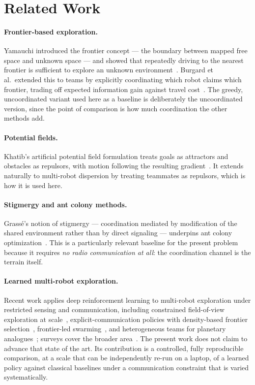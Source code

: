 \documentclass[11pt]{article}
\begin{document}
\section{Related Work}

\paragraph{Frontier-based exploration.}
Yamauchi introduced the frontier concept --- the boundary between mapped free
space and unknown space --- and showed that repeatedly driving to the nearest
frontier is sufficient to explore an unknown environment~\cite{yamauchi1997}.
Burgard et al.\ extended this to teams by explicitly coordinating which robot
claims which frontier, trading off expected information gain against travel
cost~\cite{burgard2005}. The greedy, uncoordinated variant used here as a
baseline is deliberately the uncoordinated version, since the point of
comparison is how much coordination the other methods add.

\paragraph{Potential fields.}
Khatib's artificial potential field formulation treats goals as attractors and
obstacles as repulsors, with motion following the resulting
gradient~\cite{khatib1986}. It extends naturally to multi-robot dispersion by
treating teammates as repulsors, which is how it is used here.

\paragraph{Stigmergy and ant colony methods.}
Grass\'e's notion of stigmergy --- coordination mediated by modification of the
shared environment rather than by direct signaling --- underpins ant colony
optimization~\cite{dorigo1996}. This is a particularly relevant baseline for the
present problem because it requires \emph{no radio communication at all}: the
coordination channel is the terrain itself.

\paragraph{Learned multi-robot exploration.}
Recent work applies deep reinforcement learning to multi-robot exploration under
restricted sensing and communication, including constrained field-of-view
exploration at scale~\cite{marvel}, explicit-communication policies with
density-based frontier selection~\cite{rlcomm}, frontier-led
swarming~\cite{frontierswarm}, and heterogeneous teams for planetary
analogues~\cite{planetaryrl}; surveys cover the broader
area~\cite{rlswarmsurvey}. The present work does not claim to advance that
state of the art. Its contribution is a controlled, fully reproducible
comparison, at a scale that can be independently re-run on a laptop, of a
learned policy against classical baselines under a communication constraint that
is varied systematically.
\end{document}
